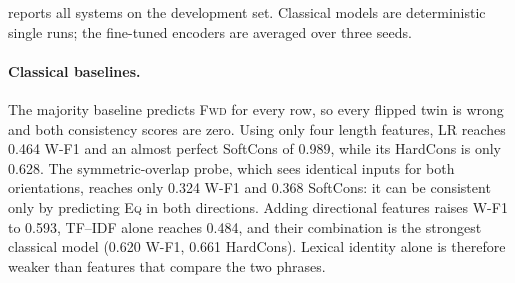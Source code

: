 \documentclass[11pt,a4paper]{article}
\newcommand{\EQ}{\textsc{Eq}}
\newcommand{\FWD}{\textsc{Fwd}}
\begin{document}
 reports all systems on the development set. Classical models are deterministic single runs; the fine-tuned encoders are averaged over three seeds.

\begin{table}[t]
\centering
\small
{}
\caption{Development-set results (Track~1, English) computed with the official scorer. W-F1, SoftCons and HardCons are the official metrics.}
\label{tab:results}
\end{table}

\paragraph{Classical baselines.} The majority baseline predicts \FWD{} for every row, so every flipped twin is wrong and both consistency scores are zero. Using only four length features, LR reaches 0.464 W-F1 and an almost perfect SoftCons of 0.989, while its HardCons is only 0.628. The symmetric-overlap probe, which sees identical inputs for both orientations, reaches only 0.324 W-F1 and 0.368 SoftCons: it can be consistent only by predicting \EQ{} in both directions. Adding directional features raises W-F1 to 0.593, TF--IDF alone reaches 0.484, and their combination is the strongest classical model (0.620 W-F1, 0.661 HardCons). Lexical identity alone is therefore weaker than features that compare the two phrases.
\end{document}
